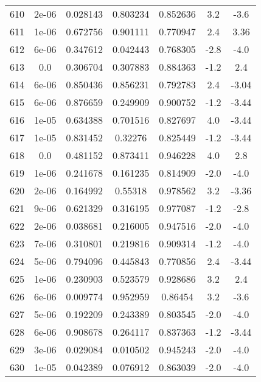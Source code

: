 \begin{table}
\begin{tabular}{c|c|c|c|c|c|c}
610 & 2e-06 & 0.028143 & 0.803234 & 0.852636 & 3.2 & -3.6\\
611 & 1e-06 & 0.672756 & 0.901111 & 0.770947 & 2.4 & 3.36\\
612 & 6e-06 & 0.347612 & 0.042443 & 0.768305 & -2.8 & -4.0\\
613 & 0.0 & 0.306704 & 0.307883 & 0.884363 & -1.2 & 2.4\\
614 & 6e-06 & 0.850436 & 0.856231 & 0.792783 & 2.4 & -3.04\\
615 & 6e-06 & 0.876659 & 0.249909 & 0.900752 & -1.2 & -3.44\\
616 & 1e-05 & 0.634388 & 0.701516 & 0.827697 & 4.0 & -3.44\\
617 & 1e-05 & 0.831452 & 0.32276 & 0.825449 & -1.2 & -3.44\\
618 & 0.0 & 0.481152 & 0.873411 & 0.946228 & 4.0 & 2.8\\
619 & 1e-06 & 0.241678 & 0.161235 & 0.814909 & -2.0 & -4.0\\
620 & 2e-06 & 0.164992 & 0.55318 & 0.978562 & 3.2 & -3.36\\
621 & 9e-06 & 0.621329 & 0.316195 & 0.977087 & -1.2 & -2.8\\
622 & 2e-06 & 0.038681 & 0.216005 & 0.947516 & -2.0 & -4.0\\
623 & 7e-06 & 0.310801 & 0.219816 & 0.909314 & -1.2 & -4.0\\
624 & 5e-06 & 0.794096 & 0.445843 & 0.770856 & 2.4 & -3.44\\
625 & 1e-06 & 0.230903 & 0.523579 & 0.928686 & 3.2 & 2.4\\
626 & 6e-06 & 0.009774 & 0.952959 & 0.86454 & 3.2 & -3.6\\
627 & 5e-06 & 0.192209 & 0.243389 & 0.803545 & -2.0 & -4.0\\
628 & 6e-06 & 0.908678 & 0.264117 & 0.837363 & -1.2 & -3.44\\
629 & 3e-06 & 0.029084 & 0.010502 & 0.945243 & -2.0 & -4.0\\
630 & 1e-05 & 0.042389 & 0.076912 & 0.863039 & -2.0 & -4.0\\
\end{tabular}
\end{table}
\newpage
